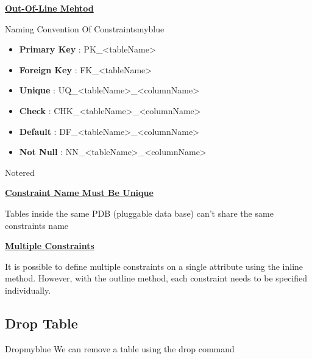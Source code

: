 \vspace{0.5cm}
\textbf{\underline{Out-Of-Line Mehtod}}

\vspace{0.25cm}


\vspace{1cm}
\begin{prettyBox}{Naming Convention Of Constraints}{myblue}
  \begin{itemize}
        \item  \textbf{Primary Key} : PK\_\textless tableName\textgreater  
        \item  \textbf{Foreign Key} : FK\_\textless tableName\textgreater
        \item  \textbf{Unique} : UQ\_\textless tableName\textgreater\_\textless columnName\textgreater
        \item  \textbf{Check} : CHK\_\textless tableName\textgreater\_\textless columnName\textgreater
        \item  \textbf{Default} : DF\_\textless tableName\textgreater\_\textless columnName\textgreater
        \item  \textbf{Not Null} : NN\_\textless tableName\textgreater\_\textless columnName\textgreater
    \end{itemize}   
\end{prettyBox}

\begin{prettyBox}{Note}{red}

    \textbf{\underline{Constraint Name Must Be Unique}}

\vspace{0.15cm}
Tables inside the same PDB (pluggable data base) can't share the same constraints name

\vspace{0.25cm}
\textbf{\underline{Multiple Constraints}}

\vspace{0.15cm}
It is possible to define multiple constraints on a single attribute using the inline method. 
However, with the outline method, each constraint needs to be specified individually.

\end{prettyBox}


\subsection{Drop Table}
\begin{prettyBox}{Drop}{myblue}
    We can remove a table using the drop command
\end{prettyBox}


